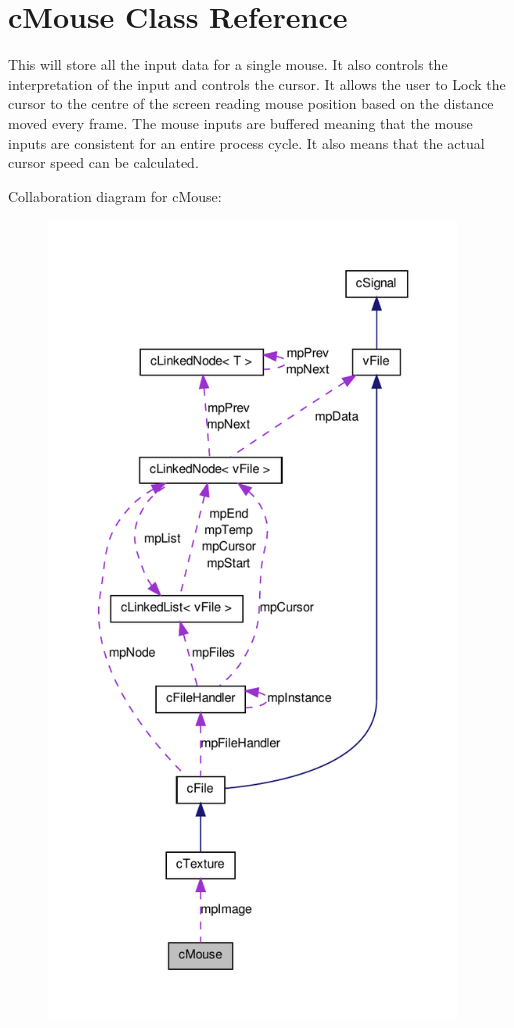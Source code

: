\hypertarget{classc_mouse}{
\section{cMouse Class Reference}
\label{classc_mouse}
}


This will store all the input data for a single mouse. It also controls the interpretation of the input and controls the cursor. It allows the user to Lock the cursor to the centre of the screen reading mouse position based on the distance moved every frame. The mouse inputs are buffered meaning that the mouse inputs are consistent for an entire process cycle. It also means that the actual cursor speed can be calculated.  




Collaboration diagram for cMouse:\nopagebreak
\begin{figure}[H]
\begin{center}
\leavevmode
\includegraphics[height=600pt]{classc_mouse__coll__graph}
\end{center}
\end{figure}
